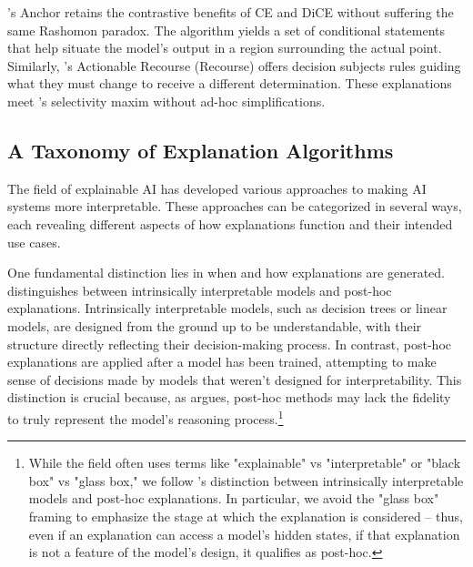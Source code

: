 \textcite{ribeiro_anchors_2018}'s Anchor retains the contrastive benefits of CE and DiCE without suffering the same Rashomon paradox. The algorithm yields a set of conditional statements that help situate the model's output in a region surrounding the actual point. Similarly, \textcite{ustun_actionable_2019}'s Actionable Recourse (Recourse) offers decision subjects rules guiding what they must change to receive a different determination. These explanations meet \textcite{miller_explanation_2017}'s selectivity maxim without ad-hoc simplifications.

\subsection{A Taxonomy of Explanation Algorithms}
The field of explainable AI has developed various approaches to making AI systems more interpretable. These approaches can be categorized in several ways, each revealing different aspects of how explanations function and their intended use cases.


One fundamental distinction lies in when and how explanations are generated. \textcite{molnar_interpretable_2019} distinguishes between intrinsically interpretable models and post-hoc explanations. Intrinsically interpretable models, such as decision trees or linear models, are designed from the ground up to be understandable, with their structure directly reflecting their decision-making process. In contrast, post-hoc explanations are applied after a model has been trained, attempting to make sense of decisions made by models that weren't designed for interpretability. This distinction is crucial because, as \textcite{Lipton} argues, post-hoc methods may lack the fidelity to truly represent the model's reasoning process.\footnote{While the field often uses terms like "explainable" vs "interpretable" or "black box" vs "glass box," we follow \textcite{molnar_interpretable_2019}'s distinction between intrinsically interpretable models and post-hoc explanations. In particular, we avoid the "glass box" framing to emphasize the stage at which the explanation is considered – thus, even if an explanation can access a model's hidden states, if that explanation is not a feature of the model's design, it qualifies as post-hoc.}

